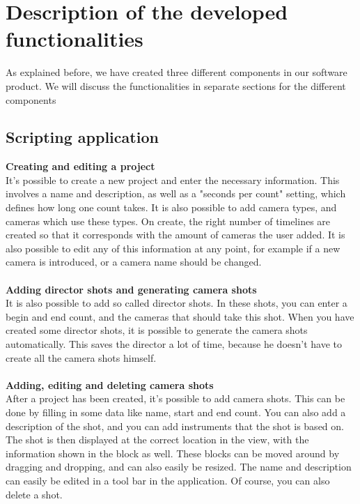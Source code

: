\section{Description of the developed functionalities}

As explained before, we have created three different components in our software product. We will discuss the functionalities in separate sections for the different components

\subsection*{Scripting application}
\textbf{Creating and editing a project}\\
It's possible to create a new project and enter the necessary information. This involves a name and description, as well as a "seconds per count" setting, which defines how long one count takes. It is also possible to add camera types, and cameras which use these types. On create, the right number of timelines are created so that it corresponds with the amount of cameras the user added. It is also possible to edit any of this information at any point, for example if a new camera is introduced, or a camera name should be changed.\\\\
\textbf{Adding director shots and generating camera shots}\\
It is also possible to add so called director shots. In these shots, you can enter a begin and end count, and the cameras that should take this shot. When you have created some director shots, it is possible to generate the camera shots automatically. This saves the director a lot of time, because he doesn't have to create all the camera shots himself.\\\\
\textbf{Adding, editing and deleting camera shots}\\
After a project has been created, it's possible to add camera shots. This can be done by filling in some data like name, start and end count. You can also add a description of the shot, and you can add instruments that the shot is based on. The shot is then displayed at the correct location in the view, with the information shown in the block as well. These blocks can be moved around by dragging and dropping, and can also easily be resized. The name and description can easily be edited in a tool bar in the application. Of course, you can also delete a shot.\\\\
